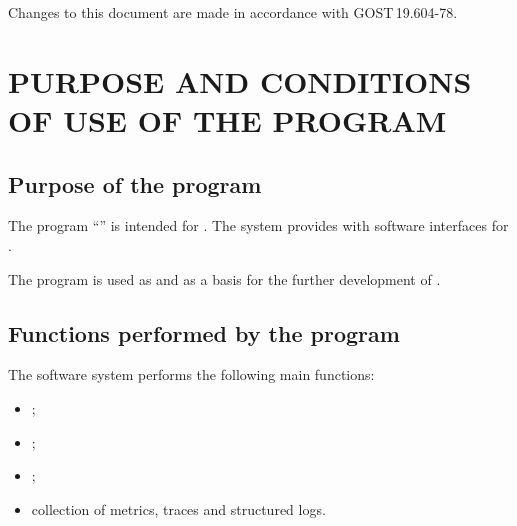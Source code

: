 \documentclass[12pt,a4paper]{extarticle}
\begin{document}
Changes to this document are made in accordance with GOST\,19.604-78\cite{gost19604}.

\clearpage

\hypersetup{linkcolor=black}
\tableofcontents
\hypersetup{linkcolor=blue}
\thispagestyle{fancy}
\clearpage

\section{PURPOSE AND CONDITIONS OF USE OF THE PROGRAM}

\subsection{Purpose of the program}

\begin{hseExample}
The program \enquote{\projectname} is intended for . The system provides  with software interfaces for .

The program is used as  and as a basis for the further development of .
\end{hseExample}

\subsection{Functions performed by the program}

\begin{hseExample}
The software system performs the following main functions:

\begin{itemize}[leftmargin=1.25cm]
    \item {};
    \item {};
    \item {};
    \item collection of metrics, traces and structured logs.
\end{itemize}
\end{hseExample}
\end{document}
